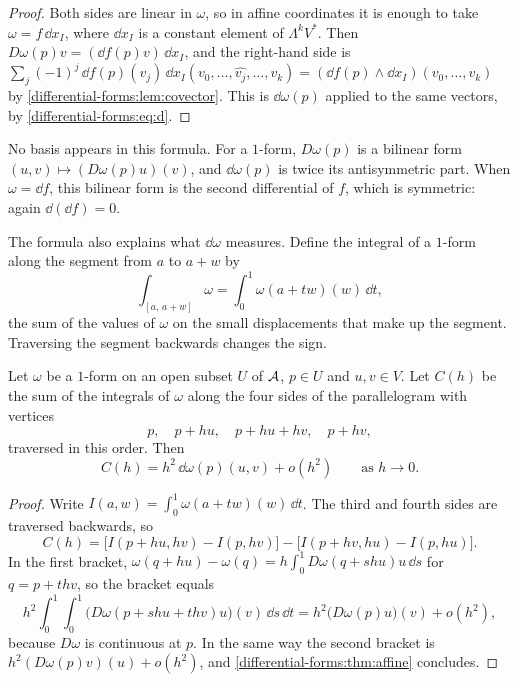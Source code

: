 \begin{notechapter}
\begin{proof}
Both sides are linear in $\omega$, so in affine coordinates it is enough
to take $\omega = f\,\dd x_I$, where $\dd x_I$ is a constant element of
$\Lambda^kV^*$. Then $D\omega(p)v = (\dd f(p)v)\,\dd x_I$, and the
right-hand side is
$\sum_j(-1)^j\,\dd f(p)(v_j)\,\dd x_I(v_0,\dots,\widehat{v_j},\dots,v_k)
= (\dd f(p)\wedge\dd x_I)(v_0,\dots,v_k)$ by
\cref{differential-forms:lem:covector}. This is $\dd\omega(p)$ applied
to the same vectors, by \eqref{differential-forms:eq:d}.
\end{proof}

No basis appears in this formula. For a $1$-form, $D\omega(p)$ is a
bilinear form $(u, v)\mapsto(D\omega(p)u)(v)$, and $\dd\omega(p)$ is
twice its antisymmetric part. When $\omega = \dd f$, this bilinear form
is the second differential of $f$, which is symmetric: again
$\dd(\dd f) = 0$.

The formula also explains what $\dd\omega$ measures. Define the integral
of a $1$-form along the segment from $a$ to $a + w$ by
\[
  \int_{[a,\,a+w]}\omega = \int_0^1\omega(a + tw)(w)\,\dd t ,
\]
the sum of the values of $\omega$ on the small displacements that make
up the segment. Traversing the segment backwards changes the sign.

\begin{proposition}
\label{differential-forms:prop:circulation}
Let $\omega$ be a $1$-form on an open subset $U$ of $\mathcal{A}$, $p\in U$ and
$u, v\in V$. Let $C(h)$ be the sum of the integrals of $\omega$ along
the four sides of the parallelogram with vertices
\[
  p ,\quad p + hu ,\quad p + hu + hv ,\quad p + hv ,
\]
traversed in this order. Then
\[
  C(h) = h^2\,\dd\omega(p)(u, v) + o(h^2)
  \qquad\text{as }h\to0 .
\]
\end{proposition}

\begin{proof}
Write $I(a, w) = \int_0^1\omega(a + tw)(w)\,\dd t$. The third and fourth
sides are traversed backwards, so
\[
  C(h) = \bigl[I(p + hu, hv) - I(p, hv)\bigr]
       - \bigl[I(p + hv, hu) - I(p, hu)\bigr] .
\]
In the first bracket,
$\omega(q + hu) - \omega(q) = h\int_0^1D\omega(q + shu)u\,\dd s$ for
$q = p + thv$, so the bracket equals
\[
  h^2\int_0^1\!\!\int_0^1
  \bigl(D\omega(p + shu + thv)u\bigr)(v)\,\dd s\,\dd t
  = h^2\bigl(D\omega(p)u\bigr)(v) + o(h^2) ,
\]
because $D\omega$ is continuous at $p$. In the same way the second
bracket is $h^2(D\omega(p)v)(u) + o(h^2)$, and
\cref{differential-forms:thm:affine} concludes.
\end{proof}


\end{notechapter}
